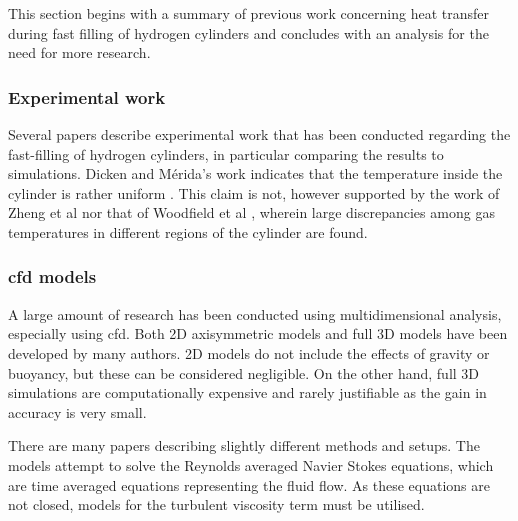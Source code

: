This section begins with  a summary of previous work concerning heat transfer during fast filling of hydrogen cylinders and concludes with an analysis for the need for more research. 



\subsubsection{Experimental work}
\label{sec:experimental_work}
Several papers describe experimental work that has been conducted regarding the fast-filling of hydrogen cylinders, in particular comparing the results to simulations. Dicken and M\'erida's work indicates that the temperature inside the cylinder is rather uniform \cite{Dicken2007}. This claim is not, however supported by the work of Zheng et al \cite{Zheng2013} nor that of Woodfield et al \cite{Woodfield2008}, wherein large discrepancies among gas temperatures in different regions of the cylinder are found.



\subsubsection{\Acrfull{cfd} models}
\label{sec:cfdModels}

A large amount of research has been conducted using multidimensional analysis, especially using \gls{cfd}. Both 2D axisymmetric models and full 3D models have been developed by many authors. 2D models do not include the effects of gravity or buoyancy, but these can be considered negligible. On the other hand, full 3D simulations are computationally expensive and rarely justifiable as the gain in accuracy is very small. 

There are many papers describing slightly different methods and setups. The models attempt to solve the Reynolds averaged Navier Stokes equations, which are time averaged equations representing the fluid flow. As these equations are not closed, models for the turbulent viscosity term must be utilised.

